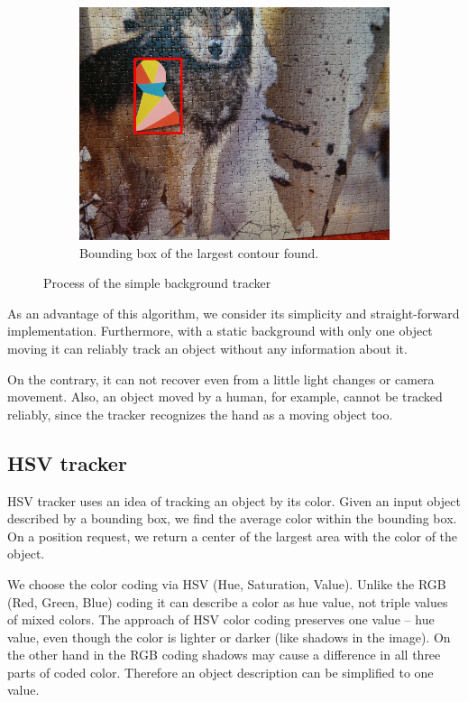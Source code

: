 \begin{figure}
\begin{subfigure}[b]{0.48\linewidth}
    \includegraphics[width=\linewidth]{img/simple_background/result.jpg}
    \caption{Bounding box of the largest contour found.}
  \end{subfigure}
  \caption{Process of the simple background tracker}
  \label{fig:simple-background-tracker}
\end{figure}

As an advantage of this algorithm, we consider its simplicity and
straight-forward implementation. Furthermore, with a static background with
only one object moving it can reliably track an object without any information
about it.

On the contrary, it can not recover even from a little light changes or camera
movement. Also, an object moved by a human, for example, cannot be tracked
reliably, since the tracker recognizes the hand as a moving object
too.

\subsection{HSV tracker}

HSV tracker uses an idea of tracking an object by its color. Given an input
object described by a bounding box, we find the average color within the
bounding box. On a position request, we return a center of the largest area
with the color of the object.

We choose the color coding via HSV (Hue, Saturation, Value). Unlike the RGB (Red,
Green, Blue) coding it can describe a color as hue value, not triple values of
mixed colors. The approach of HSV color coding preserves one value -- hue
value,  even though the color is lighter or darker (like shadows in the image).
On the other hand in the RGB coding shadows may cause a difference in all three
parts of coded color. Therefore an object description can be simplified
to one value.

